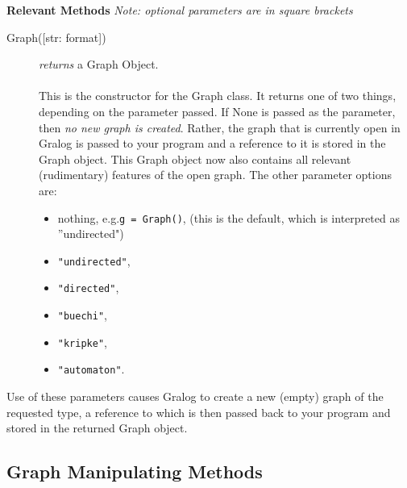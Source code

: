 \documentclass{article}
\newlength\q
\begin{document}
\textbf{{\large Relevant Methods}}
\textit{Note: optional parameters are in square brackets}


\begin{description}
\item[Graph({[str: format]})] \emph{returns} a Graph Object.\\\\
This is the constructor for the Graph class. It returns one of two things, depending on the parameter passed. If None is passed as the parameter, then \textit{no new graph is created}. Rather, the graph that is currently open in Gralog is passed to your program and a reference to it is stored in the Graph object. This Graph object now also contains all relevant (rudimentary) features of the open graph. The other parameter options are:
\begin{itemize}
\item nothing, e.g.\@ \texttt{g = Graph()}, (this is the default, which is interpreted as ''undirected")
\item \texttt{"{}undirected"},
\item \texttt{"directed"},
\item \texttt{"buechi"},
\item \texttt{"kripke"},
\item \texttt{"{}automaton"}.
\end{itemize}
\end{description}

Use of these parameters causes Gralog to create a new (empty) graph of the requested type, a reference to which is then passed back to your program and stored in the returned Graph object.
\subsection{Graph Manipulating Methods}
\end{document}
